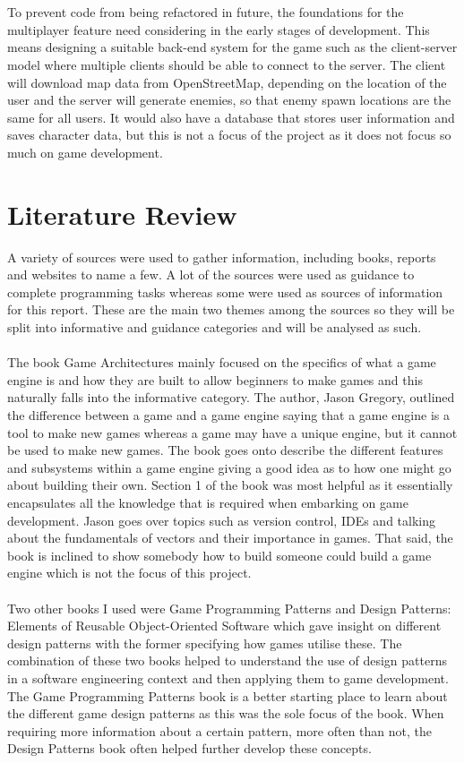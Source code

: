 \documentclass[a4paper]{report}
\begin{document}
\\\\
To prevent code from being refactored in future, the foundations for the multiplayer feature need considering in the early stages of development. This means designing a suitable back-end system for the game such as the client-server model where multiple clients should be able to connect to the server. The client will download map data from OpenStreetMap, depending on the location of the user and the server will generate enemies, so that enemy spawn locations are the same for all users. It would also have a database that stores user information and saves character data, but this is not a focus of the project as it does not focus so much on game development.
\section{Literature Review}
A variety of sources were used to gather information, including books, reports and websites to name a few. A lot of the sources were used as guidance to complete programming tasks whereas some were used as sources of information for this report. These are the main two themes among the sources so they will be split into informative and guidance categories and will be analysed as such.
\\\\
The book Game Architectures mainly focused on the specifics of what a game engine is and how they are built to allow beginners to make games and this naturally falls into the informative category. The author, Jason Gregory, outlined the difference between a game and a game engine saying that a game engine is a tool to make new games whereas a game may have a unique engine, but it cannot be used to make new games. The book goes onto describe the different features and subsystems within a game engine giving a good idea as to how one might go about building their own. Section 1 of the book was most helpful as it essentially encapsulates all the knowledge that is required when embarking on game development. Jason goes over topics such as version control, IDEs and talking about the fundamentals of vectors and their importance in games. That said, the book is inclined to show somebody how to build someone could build a game engine which is not the focus of this project.  \cite{GA}
\\\\
Two other books I used were Game Programming Patterns and Design Patterns: Elements of Reusable Object-Oriented Software which gave insight on different design patterns with the former specifying how games utilise these. The combination of these two books helped to understand the use of design patterns in a software engineering context and then applying them to game development. The Game Programming Patterns book is a better starting place to learn about the different game design patterns as this was the sole focus of the book. When requiring more information about a certain pattern, more often than not, the Design Patterns book often helped further develop these concepts. \cite{GPP} \cite{GOF}
\end{document}
